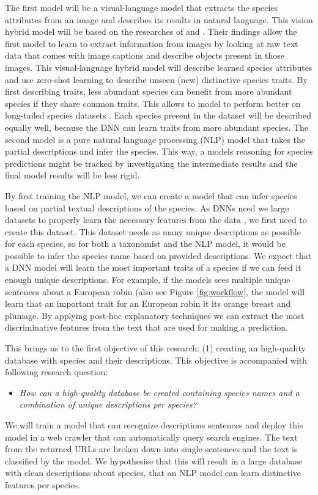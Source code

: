 \documentclass[a4paper, 12pt, oneside]{book} %
\begin{document}
The first model will be a visual-language model that extracts the species attributes from an image and describes its results in natural language. 
This vision hybrid model will be based on the researches of \textcite{radford_learning_2021} and \textcite{huang_interpretable_2020}.
Their findings allow the first model to learn to extract information from images by looking at raw text data that comes with image captions and describe objects present in those images.
This visual-language hybrid model will describe learned species attributes and use zero-shot learning to describe unseen (new) distinctive species traits.
By first describing traits, less abundant species can benefit from more abundant species if they share common traits.
This allows to model to perform better on long-tailed species datasets \autocite{van_horn_inaturalist_2018}.
Each species present in the dataset will be described equally well, because the DNN can learn traits from more abundant species.
The second model is a pure natural language processing (NLP) model that takes the partial descriptions and infer the species.
This way, a models reasoning for species predictions might be tracked by investigating the intermediate results \autocite{ishikawa_contextual_2021} and the final model results will be less rigid.

By first training the NLP model, we can create a model that can infer species based on partial textual descriptions of the species. 
As DNNs need we large datasets to properly learn the necessary features from the data \autocite{xue-wen_chen_big_2014, gheisari_survey_2017}, we first need to create this dataset.
This dataset needs as many unique descriptions as possible for each species, so for both a taxonomist and the NLP model, it would be possible to infer the species name based on provided descriptions.
We expect that a DNN model will learn the most important traits of a species if we can feed it enough unique descriptions.
For example, if the models sees multiple unique sentences about a European robin (also see Figure \ref{fig:workflow}, the model will learn that an important trait for an European robin it its orange breast and plumage.
By applying post-hoc explanatory techniques we can extract the most discriminative features from the text that are used for making a prediction.

This brings us to the first objective of this research: (1) creating an high-quality database with species and their descriptions.
This objective is accompanied with following research question:
\begin{itemize}
    \item \emph{How can a high-quality database be created containing species names and a combination of unique descriptions per species?}
\end{itemize}
We will train a model that can recognize descriptions sentences and deploy this model in a web crawler that can automatically query search engines.
The text from the returned URLs are broken down into single sentences and the text is classified by the model.
We hypothesise that this will result in a large database with clean descriptions about species, that an NLP model can learn distinctive features per species.
\end{document}
